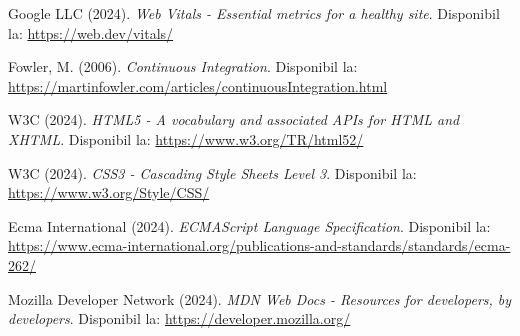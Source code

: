 \documentclass[12pt,a4paper]{report}
\begin{document}
\begin{thebibliography}{20}
Google LLC (2024). \textit{Web Vitals - Essential metrics for a healthy site}. Disponibil la: \url{https://web.dev/vitals/}

Fowler, M. (2006). \textit{Continuous Integration}. Disponibil la: \url{https://martinfowler.com/articles/continuousIntegration.html}

W3C (2024). \textit{HTML5 - A vocabulary and associated APIs for HTML and XHTML}. Disponibil la: \url{https://www.w3.org/TR/html52/}

W3C (2024). \textit{CSS3 - Cascading Style Sheets Level 3}. Disponibil la: \url{https://www.w3.org/Style/CSS/}

Ecma International (2024). \textit{ECMAScript Language Specification}. Disponibil la: \url{https://www.ecma-international.org/publications-and-standards/standards/ecma-262/}

Mozilla Developer Network (2024). \textit{MDN Web Docs - Resources for developers, by developers}. Disponibil la: \url{https://developer.mozilla.org/}

\end{thebibliography}
\end{document}
